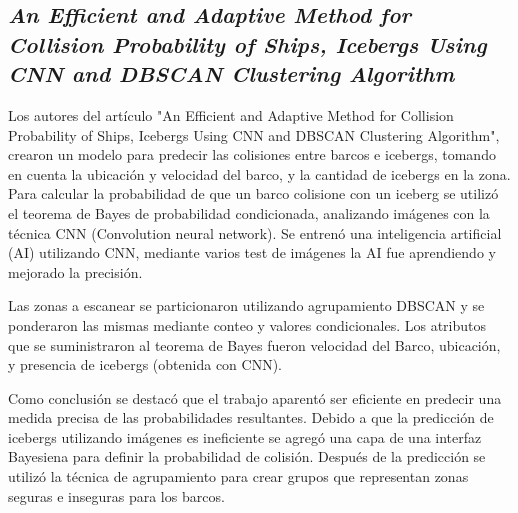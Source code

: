 \subsection{
    \textbf{\emph{An Efficient and Adaptive Method for Collision
            Probability of Ships, Icebergs Using CNN
            and DBSCAN Clustering Algorithm}
    }
}

Los autores del artículo "An Efficient and Adaptive Method for Collision
Probability of Ships, Icebergs Using CNN
and DBSCAN Clustering Algorithm"\cite[pág. 20]{somaniEmerging2019}, crearon un modelo para predecir las colisiones entre barcos e icebergs,
tomando en cuenta la ubicación y velocidad del barco, y la cantidad de icebergs en la zona.
Para calcular la probabilidad de que un barco colisione con un iceberg
se utilizó el teorema de Bayes de probabilidad condicionada, analizando imágenes con la técnica CNN (Convolution neural network).
Se entrenó una inteligencia artificial (AI) utilizando CNN, mediante varios test de imágenes la AI fue aprendiendo
y mejorado la precisión.\par

Las zonas a escanear se particionaron utilizando agrupamiento DBSCAN  y se ponderaron
las mismas mediante conteo y valores condicionales. Los atributos que se suministraron al teorema de Bayes fueron
velocidad del Barco, ubicación, y presencia de icebergs (obtenida con CNN).\par

Como conclusión se destacó que el trabajo aparentó ser eficiente en predecir
una medida precisa de  las probabilidades resultantes.
Debido a que la predicción de icebergs utilizando imágenes es ineficiente se agregó una capa de una interfaz Bayesiena
para definir la probabilidad de colisión. Después de la predicción se utilizó
la técnica de agrupamiento para crear grupos que representan zonas seguras e inseguras para los barcos.\par